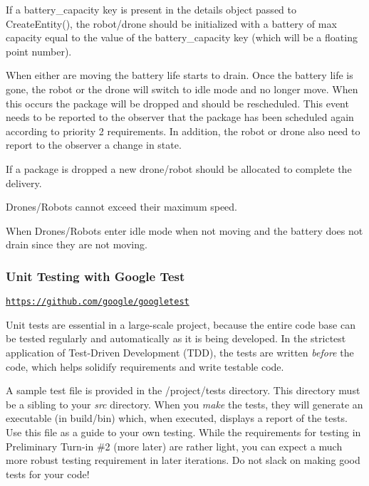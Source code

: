 \begin{DoxyItemize}
\item If a \textquotesingle{}battery\+\_\+capacity\textquotesingle{} key is present in the {\ttfamily details} object passed to {\ttfamily Create\+Entity()}, the robot/drone should be initialized with a battery of max capacity equal to the value of the \textquotesingle{}battery\+\_\+capacity\textquotesingle{} key (which will be a floating point number).
\item When either are moving the battery life starts to drain. Once the battery life is gone, the robot or the drone will switch to idle mode and no longer move. When this occurs the package will be dropped and should be rescheduled. This event needs to be reported to the observer that the package has been scheduled again according to priority 2 requirements. In addition, the robot or drone also need to report to the observer a change in state.
\item If a package is dropped a new drone/robot should be allocated to complete the delivery.
\item Drones/\+Robots cannot exceed their maximum speed.
\item When Drones/\+Robots enter idle mode when not moving and the battery does not drain since they are not moving.
\end{DoxyItemize}

\subsubsection*{Unit Testing with Google Test}

\href{https://github.com/google/googletest}{\tt https\+://github.\+com/google/googletest}

Unit tests are essential in a large-\/scale project, because the entire code base can be tested regularly and automatically as it is being developed. In the strictest application of Test-\/\+Driven Development (T\+DD), the tests are written {\itshape before} the code, which helps solidify requirements and write testable code.

A sample test file is provided in the /project/tests directory. This directory must be a sibling to your {\itshape src} directory. When you {\itshape make} the tests, they will generate an executable (in build/bin) which, when executed, displays a report of the tests. Use this file as a guide to your own testing. While the requirements for testing in Preliminary Turn-\/in \#2 (more later) are rather light, you can expect a much more robust testing requirement in later iterations. Do not slack on making good tests for your code!


